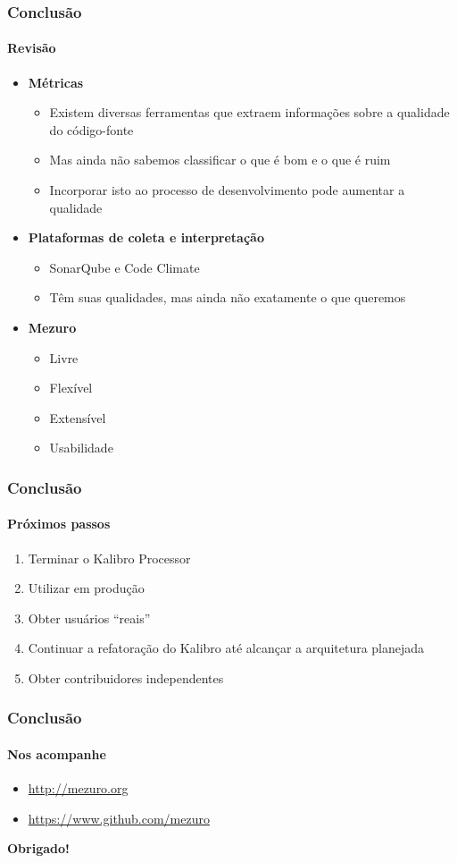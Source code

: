 \documentclass{beamer}
\begin{document}
\begin{frame}
  \frametitle{Conclusão}
  \framesubtitle{Revisão}

  \begin{itemize}
    \item \textbf{Métricas}
      \begin{itemize}
        \item Existem diversas ferramentas que extraem informações sobre a qualidade do código-fonte
        \item Mas ainda não sabemos classificar o que é bom e o que é ruim
        \item Incorporar isto ao processo de desenvolvimento pode aumentar a qualidade
      \end{itemize}
    \item \textbf{Plataformas de coleta e interpretação}
      \begin{itemize}
        \item SonarQube e Code Climate
        \item Têm suas qualidades, mas ainda não exatamente o que queremos
      \end{itemize}
    \item \textbf{Mezuro}
      \begin{itemize}
        \item Livre
        \item Flexível
        \item Extensível
        \item Usabilidade
      \end{itemize}
  \end{itemize}
\end{frame}

\begin{frame}
  \frametitle{Conclusão}
  \framesubtitle{Próximos passos}

  \begin{enumerate}
    \item Terminar o Kalibro Processor
    \item Utilizar em produção
    \item Obter usuários ``reais''
    \item Continuar a refatoração do Kalibro até alcançar a arquitetura planejada
    \item Obter contribuidores independentes
  \end{enumerate}
\end{frame}

\begin{frame}
  \frametitle{Conclusão}
  \framesubtitle{Nos acompanhe}

  \begin{itemize}
    \item \url{http://mezuro.org}
    \item \url{https://www.github.com/mezuro}
  \end{itemize}

  \LARGE{\textbf{Obrigado!}}
\end{frame}
\end{document}
